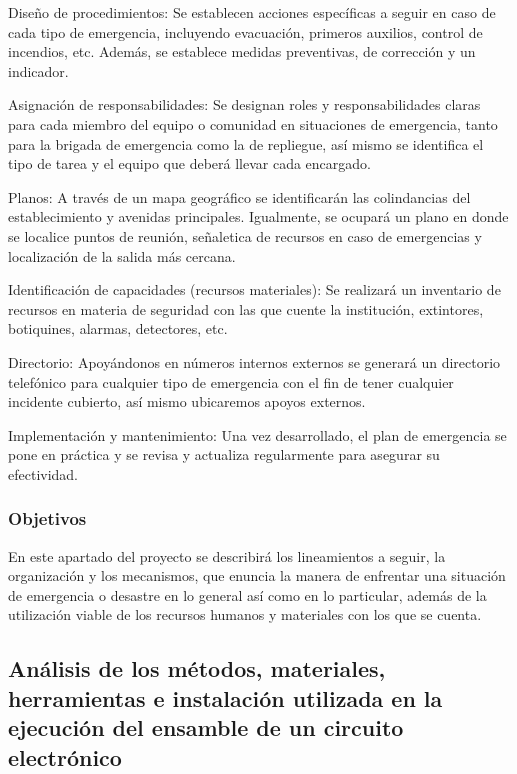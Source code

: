     
    Diseño de procedimientos: Se establecen acciones específicas a seguir en caso de cada tipo de emergencia, incluyendo evacuación, primeros auxilios, control de incendios, etc. Además, se establece medidas preventivas, de corrección y un indicador.
    
    Asignación de responsabilidades: Se designan roles y responsabilidades claras para cada miembro del equipo o comunidad en situaciones de emergencia, tanto para la brigada de emergencia como la de repliegue, así mismo se identifica el tipo de tarea y el equipo que deberá llevar cada encargado.
    
    
    Planos: A través de un mapa geográfico se identificarán las colindancias del establecimiento y avenidas principales. Igualmente, se ocupará un plano en donde se localice puntos de reunión, señaletica de recursos en caso de emergencias y localización de la salida más cercana.
    
    Identificación de capacidades (recursos materiales): Se realizará un inventario de recursos en materia de seguridad con las que cuente la institución, extintores, botiquines, alarmas, detectores, etc.
    
    Directorio: Apoyándonos en números internos externos se generará un directorio telefónico para cualquier tipo de emergencia con el fin de tener cualquier incidente cubierto, así mismo ubicaremos apoyos externos.
    
    Implementación y mantenimiento: Una vez desarrollado, el plan de emergencia se pone en práctica y se revisa y actualiza regularmente para asegurar su efectividad.
    
    
    \subsubsection{Objetivos}
    En este apartado del proyecto se describirá los lineamientos a seguir, la organización y los mecanismos, que enuncia la manera de enfrentar una situación de emergencia o desastre en lo general
    así como en lo particular, además de la utilización viable de los recursos humanos y materiales con los que se cuenta.
    
    
    
    
    \subsection{Análisis de los métodos, materiales, herramientas e instalación utilizada en la ejecución del ensamble de un circuito electrónico}
    
